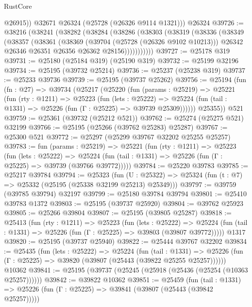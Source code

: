 \begin{lexlean}{RustCore}
\begin{coremodule}
          @26915))
      @32671
      @26324
      (@25728 (@26326 @9114 @1321)))
    @26324
@39726 := @38216
    (@38241
      (@38282
        (@38284
          (@38286
            (@38303
              (@38319
                (@38336
                  (@38349
                    (@38357
                      (@38361
                        (@38369
                          (@39704 (@25728 (@26326 @9102 @10213)))
                          @26342
                          @26346
                          @26351
                          @26356
                          @26362
                          @28156)))))))))))
@39727 := @25178 @319
@39731 := @25180 (@25184 @319) (@25190 @319)
@39732 := @25199 @32196
@39734 := @25195 (@39732 @25214)
@39736 := @25237 (@25238 @319)
@39737 := @25233 @39736
@39739 := @25195 (@39737 @25262)
@39756 := @25194
    (fun (fn : @27) =>
    @39734
      (@25217
        (@25220
          (fun (params : @25219) =>
          @25221
            (fun (rty : @1211) =>
            @25223
              (fun (lets : @25222) =>
              @25224 (fun (tail : @1331) => @25226 (fun (Γ : @25225) => @39739 @25309))))))
        @25355))
    @521
@39759 := @25361 (@39732 (@25212 @521))
@39762 := @25274 (@25275 @521) @32199
@39766 := @25195 (@25266 (@39762 @25283) @25287)
@39767 := @25300 @521
@39772 := @25297 (@25299 @39767 @32202 @25255 @25257)
@39783 := fun (params : @25219) =>
  @25221
    (fun (rty : @1211) =>
    @25223
      (fun (lets : @25222) =>
      @25224 (fun (tail : @1331) => @25226 (fun (Γ : @25225) => @39739 (@39766 @39772)))))
@39784 := @25220 @39783
@39785 := @25217 @39784
@39794 := @25323
    (fun (U : @25322) => @25324 (fun (t : @7) => @25332 (@25195 (@25338 @32199 @25213) @25349)))
@39797 := @39759 (@39785 @39794) @32197
@39799 := @25180 @39784 @39794
@39801 := @25410 @39783 @1372
@39803 := @25195 (@39737 @25920)
@39804 := @39762 @25923
@39805 := @25266 @39804
@39807 := @25195 (@39805 @25287)
@39818 := @25413
    (fun (rty : @1211) =>
    @25223
      (fun (lets : @25222) =>
      @25224 (fun (tail : @1331) => @25226 (fun (Γ : @25225) => @39803 (@39807 @39772)))))
    @1317
@39820 := @25195 (@39737 @25940)
@39822 := @25444 @39767 @32202
@39834 := @25435
    (fun (lets : @25222) =>
    @25224
      (fun (tail : @1331) =>
      @25226 (fun (Γ : @25225) => @39820 (@39807 (@25443 (@39822 @25255 @25257))))))
    @10362
@39841 := @25195 (@39737 (@25245 (@25918 (@25436 (@25254 (@10363 @25257))))))
@39842 := @39822 @10362
@39851 := @25459
    (fun (tail : @1331) => @25226 (fun (Γ : @25225) => @39841 (@39807 (@25443 (@39842 @25257)))))

\end{coremodule}
\end{lexlean}
